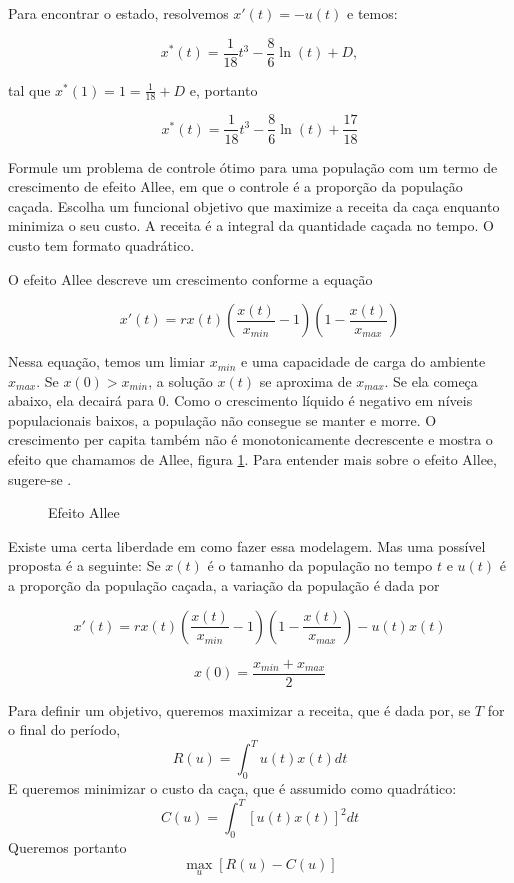 Para encontrar o estado, resolvemos $x'(t) = - u(t)$ e temos:

$$
x^*(t) = \frac{1}{18}t^3 - \frac{8}{6}\ln(t) + D,
$$

tal que $x^*(1) = 1 = \frac{1}{18} + D$ e, portanto 

$$
x^*(t) = \frac{1}{18}t^3 - \frac{8}{6}\ln(t) + \frac{17}{18}
$$

\begin{example}
    Formule um problema de controle ótimo para uma população com um termo de
    crescimento de efeito Allee, em que o controle é a proporção da população
    caçada. Escolha um funcional objetivo que maximize a receita da caça
    enquanto minimiza o seu custo. A receita é a integral da quantidade caçada
    no tempo. O custo tem  formato quadrático. 
\end{example}

O efeito Allee descreve um crescimento conforme a equação 

\begin{equation}
    x'(t) = rx(t)\left(\frac{x(t)}{x_{min}} - 1\right)\left(1 - \frac{x(t)}{x_{max}}\right)
\end{equation}

Nessa equação, temos um limiar $x_{min}$ e uma capacidade de carga do ambiente
$x_{max}$. Se $x(0) > x_{min}$, a solução $x(t)$ se aproxima de $x_{max}$. Se ela começa
abaixo, ela decairá para 0. Como o crescimento líquido é negativo em níveis
populacionais baixos, a população não consegue se manter e morre. O
crescimento per capita também não é monotonicamente decrescente e mostra o
efeito que chamamos de Allee, figura \ref{Fig1:allee-effect}. Para entender mais sobre o efeito Allee, 
sugere-se \cite{kot2001elements}. 

\begin{figure}[!ht]
    \center
    
    \caption{Efeito Allee}
    \label{Fig1:allee-effect}
\end{figure}

Existe uma certa liberdade em como fazer essa modelagem. Mas uma possível
proposta é a seguinte: Se $x(t)$ é o tamanho da população no tempo $t$ e
$u(t)$ é a proporção da população caçada, a variação da população é dada por

$$
x'(t) = rx(t)\left(\frac{x(t)}{x_{min}} - 1\right)\left(1 - \frac{x(t)}{x_{max}}\right) - u(t)x(t)
$$

$$x(0) = \frac{x_{min} + x_{max}}{2}$$

Para definir um objetivo, queremos maximizar a receita, que é dada por, se $T$
for o final do período,
$$
R(u) = \int_0^T u(t)x(t)dt
$$
E queremos minimizar o custo da caça, que é assumido como quadrático: 
$$
C(u) = \int_0^T [u(t)x(t)]^2dt
$$
Queremos portanto 
$$
\max_u [R(u) - C(u)]
$$